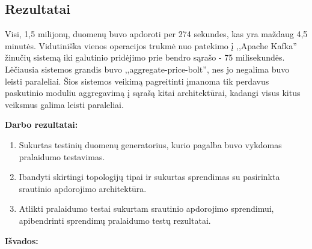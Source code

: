 \documentclass{VUMIFPSkursinis}
\begin{document}
\subsection{Rezultatai}
Visi, 1,5 milijonų, duomenų buvo apdoroti per 274 sekundes, kas yra maždaug 4,5 minutės. Vidutiniška vienos operacijos trukmė nuo 
patekimo į ,,Apache Kafka'' žinučių sistemą iki galutinio pridėjimo prie bendro sąrašo - 75 milisekundės.
Lėčiausia sistemos grandis buvo ,,aggregate-price-bolt'', nes jo negalima buvo leisti paraleliai. Šios sistemos veikimą pagreitinti 
įmanoma tik perdavus paskutinio moduliu aggregavimą į sąrašą kitai architektūrai, kadangi visus kitus veiksmus galima leisti paraleliai. 







\textbf{Darbo rezultatai:}
\vspace{1 mm}

    \begin{enumerate}
        \item Sukurtas testinių duomenų generatorius, kurio pagalba buvo vykdomas pralaidumo testavimas.
        \item Ibandyti skirtingi topologijų tipai ir sukurtas sprendimas su pasirinkta srautinio apdorojimo architektūra.
        \item Atlikti pralaidumo testai sukurtam srautinio apdorojimo sprendimui, apibendrinti sprendimų pralaidumo testų rezultatai.
    \end{enumerate}
    \vspace{1 mm}

\textbf{Išvados:}
\vspace{1 mm}
\end{document}
